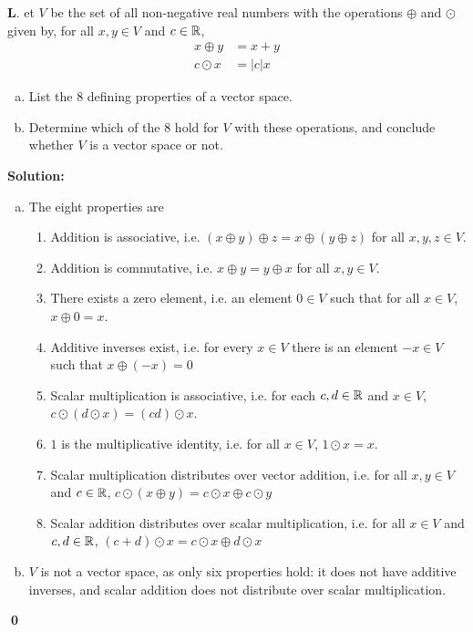 \documentclass{article}
\newenvironment{problem}[1]
{
	\begin{flushleft}
	\textbf{#1}.
	\ignorespaces
}
{
	\end{flushleft}
}
\newenvironment{solution}
{
	\ignorespaces
	\textbf{Solution:}
}
{
	\ignorespacesafterend
	\begin{flushright}
	{\bfseries \qed}
	\end{flushright}
}
\begin{document}
\begin{problem}
Let \(V\) be the set of all non-negative real numbers with the operations \(\oplus\) and \(\odot\) given by, for all $x,y \in V$ and $c \in \mathbb{R}$,
\begin{align*}
x \oplus y &= x+y \\
c \odot x &= |c|x
\end{align*}

\begin{enumerate}[(a)]
\item List the 8 defining properties of a vector space.
\item Determine which of the 8 hold for $V$ with these operations, and conclude whether $V$ is a vector space or not.
\end{enumerate}
\end{problem}
\begin{solution}
\begin{enumerate}[(a)]
\item The eight properties are
	\begin{enumerate}[1)]
		\item Addition is associative, i.e. \((x\oplus y)\oplus z = x\oplus (y \oplus z)\) for all \(x,y,z \in V\).
		\item Addition is commutative, i.e. \(x\oplus y = y \oplus x\) for all \(x,y \in V\).
		\item There exists a zero element, i.e. an element \(0 \in V\) such that for all \(x \in V\), \(x\oplus 0 = x\).
		\item Additive inverses exist, i.e. for every \(x \in V\) there is an element \(-x \in V\) such that \(x \oplus (-x) = 0 \)
		\item Scalar multiplication is associative, i.e. for each \(c,d \in \mathbb{R}\) and \(x \in V\), \(c\odot (d\odot x) = (cd) \odot x\).
		\item \(1\) is the multiplicative identity, i.e. for all \(x \in V\), \(1 \odot x = x \).
		\item Scalar multiplication distributes over vector addition, i.e. for all \(x,y \in V\) and \(c \in \mathbb{R}\), \(c\odot(x\oplus y) = c\odot x \oplus c \odot y\)
		\item Scalar addition distributes over scalar multiplication, i.e. for all \(x \in V\) and \(c,d \in \mathbb{R}\), \( (c+d)\odot x = c\odot x \oplus d \odot x \)
	\end{enumerate}
\item \(V\) is not a vector space, as only six properties hold: it does not have additive inverses, and scalar addition does not distribute over scalar multiplication.
\end{enumerate}
\end{solution}
\end{document}
